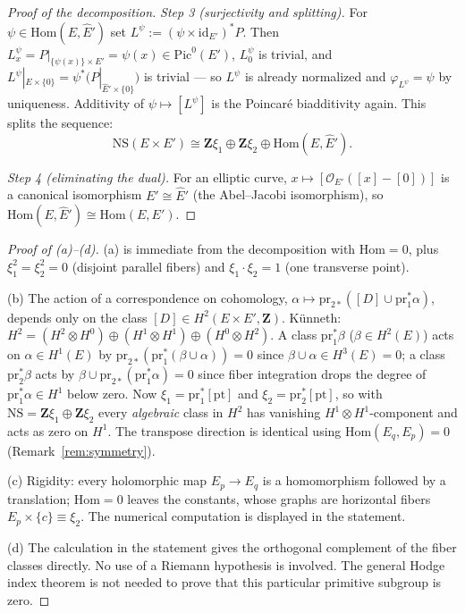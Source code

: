\documentclass[11pt]{article}
\theoremstyle{definition}
\theoremstyle{remark}
\newcommand{\Z}{\mathbf{Z}}
\newcommand{\NS}{\mathrm{NS}}
\newcommand{\Hom}{\mathrm{Hom}}
\newcommand{\Pic}{\mathrm{Pic}}
\newcommand{\pr}{\mathrm{pr}}
\begin{document}
\begin{proof}[Proof of the decomposition]
\emph{Step 3 (surjectivity and splitting).} For $\psi \in \Hom(E, \hat{E}')$
set $L^\psi := (\psi \times \mathrm{id}_{E'})^* P$. Then
$L^\psi_x = P|_{\{\psi(x)\}\times E'} = \psi(x) \in \Pic^0(E')$, $L^\psi_0$
is trivial, and $L^\psi|_{E\times\{0\}} = \psi^*\bigl(P|_{\hat{E}'\times\{0\}}\bigr)$
is trivial --- so $L^\psi$ is already normalized and
$\varphi_{L^\psi} = \psi$ by uniqueness. Additivity of
$\psi \mapsto [L^\psi]$ is the Poincar\'e biadditivity again. This splits
the sequence:
\[
\NS(E\times E') \cong \Z\xi_1 \oplus \Z\xi_2 \oplus \Hom(E, \hat{E}') .
\]

\emph{Step 4 (eliminating the dual).} For an elliptic curve,
$x \mapsto [\mathcal{O}_{E'}([x] - [0])]$ is a canonical isomorphism
$E' \cong \hat{E}'$ (the Abel--Jacobi isomorphism),
so $\Hom(E, \hat{E}') \cong \Hom(E, E')$.
\end{proof}

\begin{proof}[Proof of \textup{(a)}--\textup{(d)}]
(a) is immediate from the decomposition with $\Hom = 0$, plus
$\xi_1^2 = \xi_2^2 = 0$ (disjoint parallel fibers) and
$\xi_1\cdot\xi_2 = 1$ (one transverse point).

(b) The action of a correspondence on cohomology,
$\alpha \mapsto \pr_{2*}([D] \cup \pr_1^*\alpha)$, depends only on the class
$[D] \in H^2(E\times E', \Z)$. K\"unneth:
$H^2 = (H^2\otimes H^0) \oplus (H^1\otimes H^1) \oplus (H^0\otimes H^2)$. A
class $\pr_1^*\beta$ ($\beta \in H^2(E)$) acts on $\alpha \in H^1(E)$ by
$\pr_{2*}(\pr_1^*(\beta \cup \alpha)) = 0$ since
$\beta \cup \alpha \in H^3(E) = 0$; a class $\pr_2^*\beta$ acts by
$\beta \cup \pr_{2*}(\pr_1^*\alpha) = 0$ since fiber integration drops the
degree of $\pr_1^*\alpha \in H^1$ below zero. Now $\xi_1 = \pr_1^*[\mathrm{pt}]$
and $\xi_2 = \pr_2^*[\mathrm{pt}]$, so with $\NS = \Z\xi_1 \oplus \Z\xi_2$
every \emph{algebraic} class in $H^2$ has vanishing
$H^1\otimes H^1$-component and acts as zero on $H^1$. The transpose
direction is identical using $\Hom(E_q, E_p) = 0$
(Remark~\ref{rem:symmetry}).

(c) Rigidity: every holomorphic map $E_p \to E_q$ is a homomorphism followed
by a translation; $\Hom = 0$ leaves the constants, whose graphs are
horizontal fibers $E_p \times \{c\} \equiv \xi_2$. The numerical computation
is displayed in the statement.

(d) The calculation in the statement gives the orthogonal complement
of the fiber classes directly. No use of a Riemann hypothesis is involved.
The general Hodge index theorem is not needed to prove that this particular
primitive subgroup is zero.
\end{proof}
\end{document}
